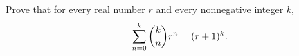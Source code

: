 Prove that for every real number $r$ and every nonnegative integer $k$,
\[\sum_{n=0}^{k}\dbinom kn r^n=(r+1)^k.\]
